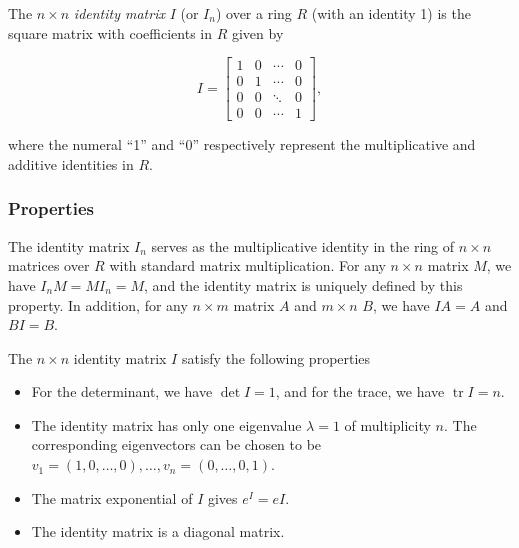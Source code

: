 \documentclass[12pt]{article}
\begin{document}
The $n \times n$ \emph{identity matrix} $I$ (or $I_n$) over a ring $R$ (with an identity 1) is the square matrix with coefficients in $R$ given by

$$ I = 
\begin{bmatrix}
1 & 0 & \cdots & 0 \\
0 & 1 & \cdots & 0 \\
0 & 0 & \ddots & 0 \\
0 & 0 & \cdots & 1
\end{bmatrix},$$

where the numeral ``1'' and ``0'' respectively represent the multiplicative and additive identities in $R$.  

\subsubsection{Properties}
The identity matrix $I_n$ serves as the multiplicative identity in the ring of $n\times n$ matrices over $R$ with standard matrix multiplication.  For any $n\times n$ matrix $M$, we have $I_nM=MI_n=M$, and the identity matrix is uniquely defined by this property.  In addition, for any $n\times m$ matrix $A$ and $m\times n$ $B$, we have $IA=A$ and $BI=B$.

The $n\times n$ identity matrix  $I$ satisfy the following properties
\begin{itemize}
\item For the determinant, we have $\det I = 1$, and for the trace, we have
$\operatorname{tr}I = n$. 
\item The identity matrix has only one eigenvalue $\lambda =1$ of
multiplicity $n$. The corresponding eigenvectors can be chosen to be 
$v_1=(1,0,\ldots, 0),\ldots, v_n=(0,\ldots, 0,1)$. 
\item The matrix exponential of $I$ gives $e^I = e I$. 
\item The identity matrix is a diagonal matrix. 
\end{itemize}
\end{document}
